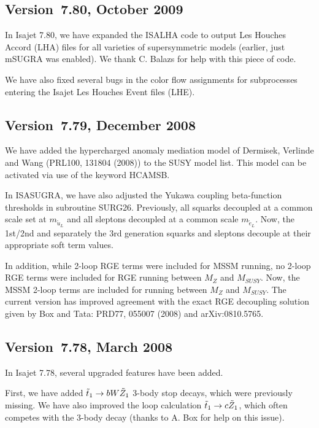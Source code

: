 \subsection{Version~7.80, October 2009}

In Isajet 7.80, we have expanded the ISALHA code to output
Les Houches Accord (LHA) files for all varieties of supersymmetric 
models (earlier, just mSUGRA was enabled). We thank C. Balazs
for help with this piece of code. 

We have also fixed several bugs in the color flow assignments 
for subprocesses entering the Isajet Les Houches Event files (LHE). 


\subsection{Version~7.79, December 2008}

We have added the hypercharged anomaly mediation model of
Dermisek, Verlinde and Wang (PRL100, 131804 (2008)) to the SUSY
model list. This model can be activated via use of the keyword HCAMSB.

In ISASUGRA, we have also adjusted the Yukawa coupling beta-function thresholds
in subroutine SURG26. Previously, all squarks decoupled at a common scale
set at $m_{{\tilde u}_L}$ and all sleptons decoupled at a common scale
$m_{{\tilde e}_L}$. Now, the 1st/2nd and separately the 
3rd generation squarks and sleptons
decouple at their appropriate soft term values.

In addition, while 2-loop RGE terms were included for MSSM running,
no 2-loop RGE terms were included for RGE running between 
$M_Z$ and $M_{SUSY}$. Now, the MSSM 2-loop terms are included for
running between $M_Z$ and $M_{SUSY}$. The current version has improved agreement with the exact RGE decoupling solution given by Box and Tata:
PRD77, 055007 (2008) and arXiv:0810.5765.

\subsection{Version~7.78, March 2008}

In Isajet 7.78, several upgraded features have been added.

First, we have added $\tilde{t}_1\rightarrow bW\tilde Z_1$ 3-body stop decays,
which were previously missing. We have also improved the loop calculation 
$\tilde{t}_1\rightarrow c\tilde Z_1$, which often competes with the 3-body decay
(thanks to A. Box for help on this issue).


